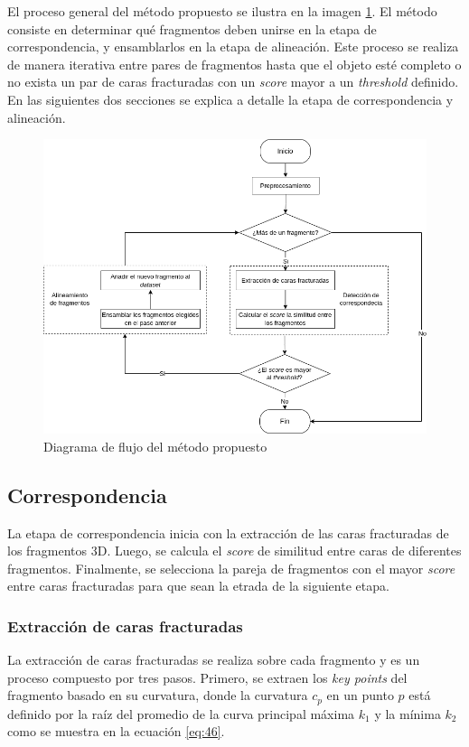 El proceso general del método propuesto se ilustra en la imagen \ref{fig:workflow}. El método consiste en determinar qué fragmentos deben unirse en la etapa de correspondencia, y ensamblarlos en la etapa de alineación. Este proceso se realiza de manera iterativa entre pares de fragmentos hasta que el objeto esté completo o no exista un par de caras fracturadas con un \textit{score} mayor a un \textit{threshold} definido. En las siguientes dos secciones se explica a detalle la etapa de correspondencia y alineación.
\begin{figure}[!h]
    \centering
     \includegraphics[scale=0.4]{images/workflow.png}
    \caption{Diagrama de flujo del método propuesto}
    \label{fig:workflow}
\end{figure}

\subsection{Correspondencia}
La etapa de correspondencia inicia con la extracción de las caras fracturadas de los fragmentos 3D. Luego, se calcula el \textit{score} de similitud entre caras de diferentes fragmentos. Finalmente, se selecciona la pareja de fragmentos con el mayor \textit{score} entre caras fracturadas para que sean la etrada de la siguiente etapa.

\subsubsection{Extracción de caras fracturadas}
La extracción de caras fracturadas se realiza sobre cada fragmento y es un proceso compuesto por tres pasos. Primero, se extraen los \textit{key points} del fragmento basado en su curvatura, donde la curvatura $c_p$ en un punto $p$ está definido por la raíz del promedio de la curva principal máxima $k_1$ y la mínima $k_2$ como se muestra en la ecuación \ref{eq:46}.

